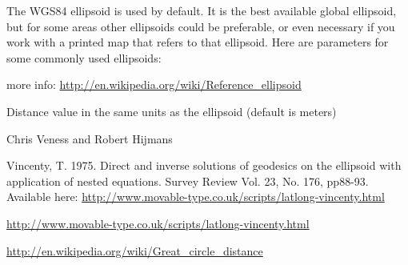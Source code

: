 \begin{Details}\relax
The WGS84 ellipsoid is used by default. It is the best available global ellipsoid, but for some areas other ellipsoids could be preferable, or even necessary if you work with a printed map that refers to that ellipsoid. Here are parameters for some commonly used ellipsoids:


more info: \url{http://en.wikipedia.org/wiki/Reference_ellipsoid}
\end{Details}
\begin{Value}
Distance value in the same units as the ellipsoid (default is meters)
\end{Value}
\begin{Author}\relax
Chris Veness and Robert Hijmans
\end{Author}
\begin{References}\relax
Vincenty, T. 1975. Direct and inverse solutions of geodesics on the ellipsoid with application of nested equations. Survey Review Vol. 23, No. 176, pp88-93.
Available here: \url{http://www.movable-type.co.uk/scripts/latlong-vincenty.html}

\url{http://www.movable-type.co.uk/scripts/latlong-vincenty.html}

\url{http://en.wikipedia.org/wiki/Great_circle_distance}
\end{References}
